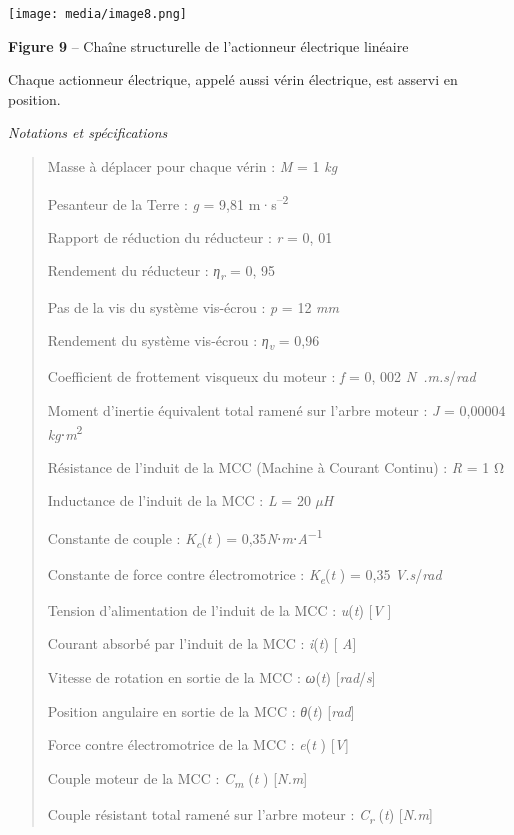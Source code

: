 \documentclass[]{article}
\begin{document}
\texttt{[image: media/image8.png]}

\textbf{Figure 9} -- Chaîne structurelle de l'actionneur électrique
linéaire

Chaque actionneur électrique, appelé aussi vérin électrique, est asservi
en position.

\emph{Notations et spécifications}

\begin{quote}
Masse à déplacer pour chaque vérin : \emph{M} = 1 \emph{kg}

Pesanteur de la Terre : \emph{g} = 9,81 m·s\textsuperscript{--2}

Rapport de réduction du réducteur : \emph{r} = 0, 01

Rendement du réducteur : \emph{η\textsubscript{r}} = 0, 95

Pas de la vis du système vis-écrou : \emph{p} = 12 \emph{mm}

Rendement du système vis-écrou : \emph{η\textsubscript{v}} = 0,96

Coefficient de frottement visqueux du moteur : \emph{f} = 0, 002
\emph{N~.m.s}/\emph{rad}

Moment d'inertie équivalent total ramené sur l'arbre moteur : \emph{J} =
0,00004 \emph{kg}⋅\emph{m}\textsuperscript{2}

Résistance de l'induit de la MCC (Machine à Courant Continu) : \emph{R}
= 1 Ω

Inductance de l'induit de la MCC : \emph{L} = 20 \emph{µH}

Constante de couple : \emph{K\textsubscript{c}}(\emph{t} ) =
0,35\emph{N}⋅\emph{m}⋅\emph{A}\textsuperscript{−1}

Constante de force contre électromotrice :
\emph{K\textsubscript{e}}(\emph{t} ) = 0,35 \emph{V}.\emph{s}/\emph{rad}

Tension d'alimentation de l'induit de la MCC : \emph{u}(\emph{t})
{[}\emph{V} {]}

Courant absorbé par l'induit de la MCC : \emph{i}(\emph{t}) {[}
\emph{A}{]}

Vitesse de rotation en sortie de la MCC : \emph{ω}(\emph{t})
{[}\emph{rad}/\emph{s}{]}

Position angulaire en sortie de la MCC : \emph{θ}(\emph{t})
{[}\emph{rad}{]}

Force contre électromotrice de la MCC : \emph{e}(\emph{t} )
{[}\emph{V}{]}

Couple moteur de la MCC : \emph{C\textsubscript{m}} (\emph{t} )
{[}\emph{N.m}{]}

Couple résistant total ramené sur l'arbre moteur :
\emph{C\textsubscript{r}} (\emph{t}) {[}\emph{N.m}{]}
\end{quote}
\end{document}
